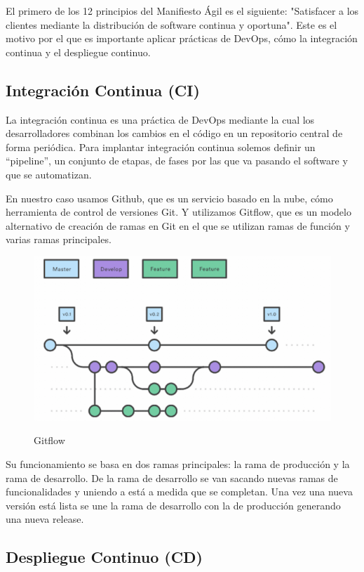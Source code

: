 \documentclass[12pt,twoside,titlepage]{report}
\begin{document}
El primero de los 12 principios del Manifiesto Ágil es el siguiente: "Satisfacer a los clientes mediante la distribución de software continua y oportuna". Este es el motivo por el que es importante aplicar prácticas de DevOps, cómo la integración continua y el despliegue continuo.

\subsection{Integración Continua (CI)}

La integración continua es una práctica de DevOps mediante la cual los desarrolladores combinan los cambios en el código en un repositorio central de forma periódica. Para implantar integración continua solemos definir un “pipeline”, un conjunto de etapas, de fases por las que va pasando el software y que se automatizan. 

En nuestro caso usamos Github, que es un servicio basado en la nube, cómo herramienta de control de versiones Git. Y utilizamos Gitflow, que es un modelo alternativo de creación de ramas en Git en el que se utilizan ramas de función y varias ramas principales.

\begin{figure}[H]
    \centering
    \includegraphics[scale=0.58]{DevOps/Gitflow}
    \label{fig:Gitflow}
    \caption{Gitflow}
\end{figure}

Su funcionamiento se basa en dos ramas principales: la rama de producción y la rama de desarrollo. De la rama de desarrollo se van sacando nuevas ramas de funcionalidades y uniendo a está a medida que se completan. Una vez una nueva versión está lista se une la rama de desarrollo con la de producción generando una nueva release.

\subsection{Despliegue Continuo (CD)}
\end{document}
